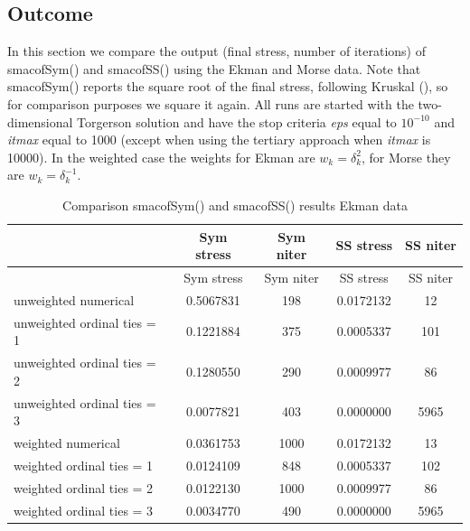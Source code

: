 \documentclass[
  12pt,
  letterpaper,
  DIV=11,
  numbers=noendperiod]{scrartcl}
\begin{document}
\subsection{Outcome}\label{outcome}

In this section we compare the output (final stress, number of
iterations) of smacofSym() and smacofSS() using the Ekman and Morse
data. Note that smacofSym() reports the square root of the final stress,
following Kruskal (), so for comparison
purposes we square it again. All runs are started with the
two-dimensional Torgerson solution and have the stop criteria \emph{eps}
equal to \ensuremath{10^{-10}} and \emph{itmax} equal to 1000 (except
when using the tertiary approach when \emph{itmax} is 10000). In the
weighted case the weights for Ekman are \(w_k = \delta_k^2\), for Morse
they are \(w_k = \delta_k^{-1}\).

\begin{longtable}[]{@{}lcccc@{}}
\caption{Comparison smacofSym() and smacofSS() results Ekman
data}\tabularnewline
\toprule\noalign{}
& Sym stress & Sym niter & SS stress & SS niter \\
\midrule\noalign{}
\endfirsthead
\toprule\noalign{}
& Sym stress & Sym niter & SS stress & SS niter \\
\midrule\noalign{}
\endhead
\bottomrule\noalign{}
\endlastfoot
unweighted numerical & 0.5067831 & 198 & 0.0172132 & 12 \\
unweighted ordinal ties = 1 & 0.1221884 & 375 & 0.0005337 & 101 \\
unweighted ordinal ties = 2 & 0.1280550 & 290 & 0.0009977 & 86 \\
unweighted ordinal ties = 3 & 0.0077821 & 403 & 0.0000000 & 5965 \\
weighted numerical & 0.0361753 & 1000 & 0.0172132 & 13 \\
weighted ordinal ties = 1 & 0.0124109 & 848 & 0.0005337 & 102 \\
weighted ordinal ties = 2 & 0.0122130 & 1000 & 0.0009977 & 86 \\
weighted ordinal ties = 3 & 0.0034770 & 490 & 0.0000000 & 5965 \\
\end{longtable}
\end{document}
